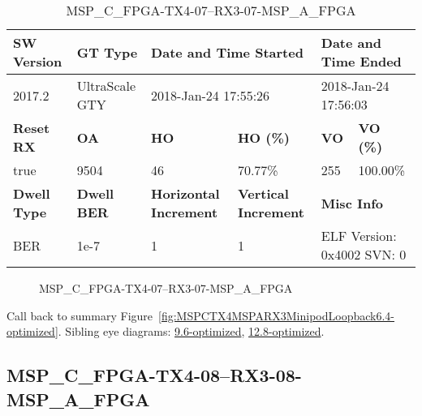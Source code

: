 \begin{table}[h]
\centering
\caption{MSP\_C\_FPGA-TX4-07--RX3-07-MSP\_A\_FPGA}
\label{tab:MSPCFPGATX407RX307MSPAFPGA6.4-optimized}
\begin{tabular}{@{}|l|l|l|l|l|l|@{}}
\toprule
\textbf{SW Version}                & \textbf{GT Type}   & \multicolumn{2}{l|}{\textbf{Date and Time Started}}            & \multicolumn{2}{l|}{\textbf{Date and Time Ended}}        \\ \midrule
2017.2                       & UltraScale GTY          & \multicolumn{2}{l|}{2018-Jan-24 17:55:26}                   & \multicolumn{2}{l|}{2018-Jan-24 17:56:03}               \\ \midrule
\textbf{Reset RX}                  & \textbf{OA} & \textbf{HO}   & \textbf{HO (\%)} & \textbf{VO} & \textbf{VO (\%)} \\ \midrule
true & 9504        & 46          & 70.77\%        & 255        & 100.00\%       \\ \midrule
\textbf{Dwell Type}                & \textbf{Dwell BER} & \textbf{Horizontal Increment} & \textbf{Vertical Increment}    & \multicolumn{2}{l|}{\textbf{Misc Info}}                  \\ \midrule
BER                            & 1e-7        & 1        & 1           & \multicolumn{2}{l|}{ELF Version: 0x4002 SVN: 0}                         \\ \bottomrule
\end{tabular}
\end{table}

\begin{figure}[h]
\caption{MSP\_C\_FPGA-TX4-07--RX3-07-MSP\_A\_FPGA} \label{fig:MSPCFPGATX407RX307MSPAFPGA6.4-optimized}
\end{figure}

Call back to summary Figure~\ref{fig:MSPCTX4MSPARX3MinipodLoopback6.4-optimized}.
Sibling eye diagrams: \hyperref[sec:MSPCFPGATX407RX307MSPAFPGA9.6-optimized]{9.6-optimized}, \hyperref[sec:MSPCFPGATX407RX307MSPAFPGA12.8-optimized]{12.8-optimized}.

\clearpage
\newpage


\subsection{MSP\_C\_FPGA-TX4-08--RX3-08-MSP\_A\_FPGA}\label{sec:MSPCFPGATX408RX308MSPAFPGA6.4-optimized}

